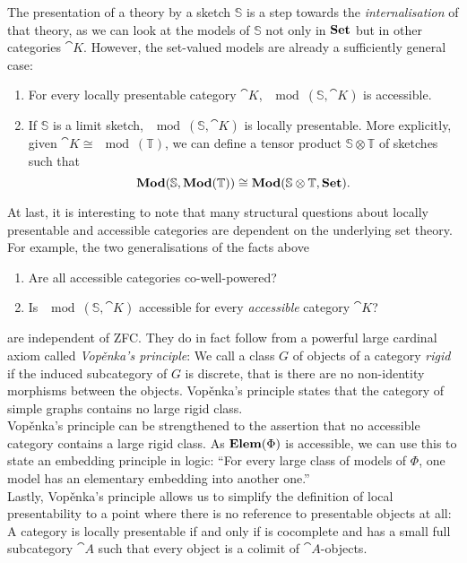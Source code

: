 The presentation of a theory by a sketch $\mathbb S$ is a step towards the \emph{internalisation} of that theory, as we can look at the models of $\mathbb S$ not only in $\mathbf{Set}$ but in other categories $\cat K$. However, the set-valued models are already a sufficiently general case:
\begin{enumerate}[resume]
\item For every locally presentable category $\cat K$, $\mod(\mathbb S, \cat K)$ is accessible.
\item If $\mathbb S$ is a limit sketch, $\mod(\mathbb S, \cat K)$ is locally presentable. More explicitly, given $\cat K \cong \mod(\mathbb T)$, we can define a tensor product $\mathbb S \otimes \mathbb T$ of sketches such that 
\[ \mathbf{Mod}(\mathbb S, \mathbf{Mod}(\mathbb T)) \cong \mathbf{Mod}(\mathbb S \otimes \mathbb T, \mathbf{Set}). \] 
\end{enumerate}

At last, it is interesting to note that many structural questions about locally presentable and accessible categories are dependent on the underlying set theory. For example, the two generalisations of the facts above 

\begin{enumerate}[resume]
\item Are all accessible categories co-well-powered?
\item Is $\mod(\mathbb S, \cat K)$ accessible for every \emph{accessible} category $\cat K$?
\end{enumerate} 

are independent of ZFC. They do in fact follow from a powerful large cardinal axiom called \emph{Vopěnka's principle}: We call a class $G$ of objects of a category \emph{rigid} if the induced subcategory of $G$ is discrete, that is there are no non-identity morphisms between the objects. Vopěnka's principle states that the category of simple graphs contains no large rigid class. \\

Vopěnka's principle can be strengthened to the assertion that no accessible category contains a large rigid class. As $\mathbf{Elem}(\Phi)$ is accessible, we can use this to state an embedding principle in logic: ``For every large class of models of $\Phi$, one model has an elementary embedding into another one.'' \\

Lastly, Vopěnka's principle allows us to simplify the definition of local presentability to a point where there is no reference to presentable objects at all: A category is locally presentable if and only if is cocomplete and has a small full subcategory $\cat A$ such that every object is a colimit of $\cat A$-objects.